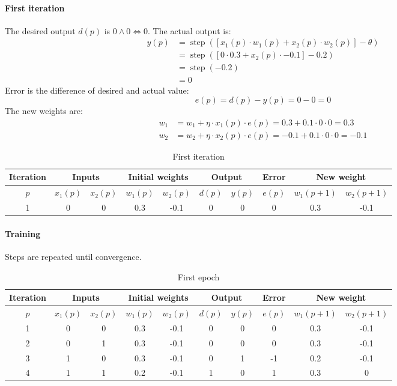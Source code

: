 \documentclass[a4paper,12pt,answers]{article}
\DeclareMathOperator*{\step}{step}
\newcommand{\stepfn}[1]{\step\left( #1 \right) }
\begin{document}
	\paragraph{First iteration}
	The desired output $d(p)$ is $0 \land 0 \iff 0$. The actual output is:
	\begin{align*}
		y(p) &= \stepfn{\left[ x_1(p) \cdot w_1(p) + x_2(p) \cdot w_2(p) \right] - \theta} \\
		&= \stepfn{\left[ 0 \cdot 0.3 + x_2(p) \cdot -0.1 \right] - 0.2} \\
		&= \stepfn{-0.2} \\
		&= 0
	\end{align*}
	Error is the difference of desired and actual value:
	\[
	e(p) = d(p) - y(p) = 0 - 0 = 0
	\]
	The new weights are:
	\begin{align*}
		w_1 &= w_1 + \eta \cdot x_1(p) \cdot e(p) = 0.3 + 0.1 \cdot 0 \cdot 0 = 0.3 \\
		w_2 &= w_2 + \eta \cdot x_2(p) \cdot e(p) = -0.1 + 0.1 \cdot 0 \cdot 0 = -0.1
	\end{align*}
	\begin{table}[H]
		\centering
		\begin{tabular}{|c|c|c|c|c|c|c|c|c|c|}
			\hline
			Iteration & \multicolumn{2}{c|}{Inputs} & \multicolumn{2}{c|}{Initial weights} & \multicolumn{2}{c|}{Output} & Error & \multicolumn{2}{c|}{New weight} \\
			\hline
			$p$ & $x_1(p)$ & $x_2(p)$ & $w_1(p)$ & $w_2(p)$ &$d(p)$ & $y(p)$ & $e(p)$ & $w_1(p+1)$ & $w_2(p+1)$ \\ \hline
			1 & 0 & 0 & 0.3 & -0.1 & 0 & 0 & 0 & 0.3 & -0.1 \\
			\hline
		\end{tabular}
		\caption{First iteration}
	\end{table}
	\paragraph{Training}
	Steps are repeated until convergence.
	\begin{table}[H]
		\centering
		\begin{tabular}{|c|c|c|c|c|c|c|c|c|c|}
			\hline
			Iteration & \multicolumn{2}{c|}{Inputs} & \multicolumn{2}{c|}{Initial weights} & \multicolumn{2}{c|}{Output} & Error & \multicolumn{2}{c|}{New weight} \\
			\hline
			$p$ & $x_1(p)$ & $x_2(p)$ & $w_1(p)$ & $w_2(p)$ &$d(p)$ & $y(p)$ & $e(p)$ & $w_1(p+1)$ & $w_2(p+1)$ \\ \hline
			1 & 0 & 0 & 0.3 & -0.1 & 0 & 0 & 0 & 0.3 & -0.1 \\
			2 & 0 & 1 & 0.3 & -0.1 & 0 & 0 & 0 & 0.3 & -0.1 \\
			3 & 1 & 0 & 0.3 & -0.1 & 0 & 1 & -1& 0.2 & -0.1 \\
			4 & 1 & 1 & 0.2 & -0.1 & 1 & 0 & 1 & 0.3 &  0 \\
			\hline
		\end{tabular}
		\caption{First epoch}
	\end{table}
	
\end{document}
